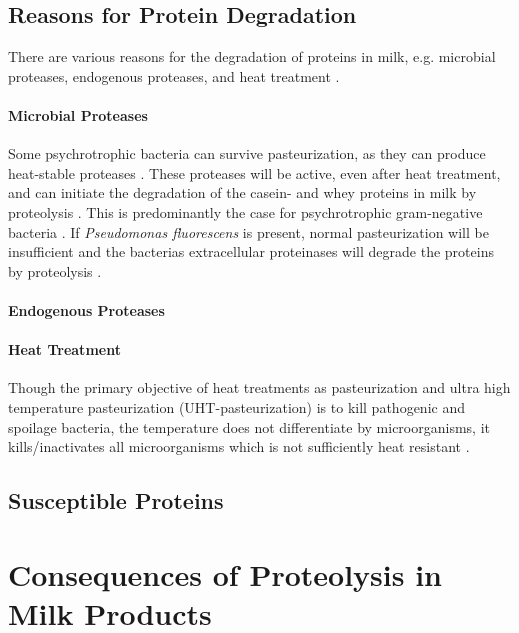\subsection{Reasons for Protein Degradation}
There are various reasons for the degradation of proteins in milk, e.g. microbial proteases, endogenous proteases, and heat treatment \cite*{a02_proteases_and_protein_degradation}. 

\paragraph*{Microbial Proteases}
    Some psychrotrophic bacteria can survive pasteurization, as they can produce heat-stable proteases \cite*{s01_heat_treatment_1}. These proteases will be active, even after heat treatment, and can initiate the degradation of the casein- and whey proteins in milk by proteolysis \cite*{b02_heat_induced_changes_in_milk}. This is predominantly the case for psychrotrophic gram-negative bacteria \cite*{s01_heat_treatment_1}.
    If \textit{Pseudomonas fluorescens} is present, normal pasteurization will be insufficient and the bacterias extracellular proteinases will degrade the proteins by proteolysis \cite*{s01_heat_treatment_1}.

\paragraph*{Endogenous Proteases}


\paragraph*{Heat Treatment}
    Though the primary objective of heat treatments as pasteurization and ultra high temperature pasteurization (UHT-pasteurization) is to kill pathogenic and spoilage bacteria, the temperature does not differentiate by microorganisms, it kills/inactivates all microorganisms which is not sufficiently heat resistant \cite*{b02_heat_induced_changes_in_milk}.

\subsection{Susceptible Proteins}


\section{Consequences of Proteolysis in Milk Products}


